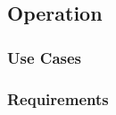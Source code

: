 \subsection{Operation}\label{sc:operation}

\blindtext %

\subsubsection{Use Cases}\label{ssc:usecases}

\blindtext %

\subsubsection{Requirements}\label{ssc:requirements}

\blindtext %
